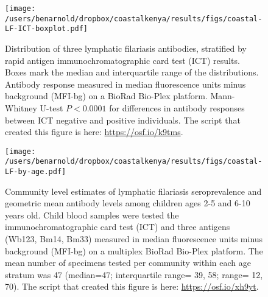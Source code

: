 \documentclass[11pt]{article}
\begin{document}
\begin{figure}[htbp]
\begin{center}
\texttt{[image: /users/benarnold/dropbox/coastalkenya/results/figs/coastal-LF-ICT-boxplot.pdf]} 
\begin{minipage}{0.9\textwidth}
\caption{Distribution of three lymphatic filariasis antibodies, stratified by rapid antigen immunochromatographic card test (ICT) results. Boxes mark the median and interquartile range of the distributions. Antibody response measured in median fluorescence units minus background (MFI-bg) on a BioRad Bio-Plex platform.  Mann-Whitney U-test $P<0.0001$ for differences in antibody responses between ICT negative and positive individuals.  The script that created this figure is here: \url{https://osf.io/k9tms}. }
\label{fig:ICTbeeswarm}
\end{minipage}
\end{center}
\end{figure}


\begin{figure}[htbp]
\begin{center}
\texttt{[image: /users/benarnold/dropbox/coastalkenya/results/figs/coastal-LF-by-age.pdf]} 
\begin{minipage}{1.1\textwidth}
\caption{Community level estimates of lymphatic filariasis seroprevalence and geometric mean antibody levels among children ages 2-5 and 6-10 years old. Child blood samples were tested the immunochromatographic card test (ICT) and three antigens (Wb123, Bm14, Bm33) measured in median fluorescence units minus background (MFI-bg) on a multiplex BioRad Bio-Plex platform. The mean number of specimens tested per community within each age stratum was 47 (median=47; interquartile range= 39, 58; range= 12, 70). The script that created this figure is here: \url{https://osf.io/xh9yt}. }
\label{fig:LFchild}
\end{minipage}
\end{center}
\end{figure}
\end{document}
